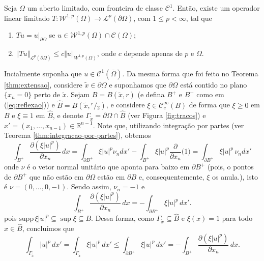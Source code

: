 \documentclass[a4paper, 11pt]{book}
\theoremstyle{definition}
\newcommand{\bR}{\mathbb{R}}
\newcommand{\cC}{\mathcal{C}}
\newcommand{\cL}{\mathcal{L}}
\newcommand{\cW}{\mathcal{W}}
\newcommand{\supp}{\mathrm{supp}\,}
\newcommand{\sfrac}[2]{{}^{#1}\!\!/\!_{#2}}
\begin{document}
\begin{tbox} \label{thm:traco-1}
    Seja $\Omega$ um aberto limitado, com fronteira de classe $\cC^1$. Então, existe um operador linear limitado $T : \cW^{1,p}(\Omega) \to \cL^p(\partial \Omega)$, com $1 \leqslant p < \infty$, tal que
    \begin{enumerate}[leftmargin=*, label=\textbf{(\alph*)}]
        \item $Tu = u \big|_{\partial \Omega}$ se $u \in \cW^{1,p}(\Omega) \cap \cC(\Omega)$;
        \item $\Vert Tu \Vert_{\cL^p(\partial\Omega)} \leqslant c \Vert u \Vert_{W^{1,p}(\Omega)}$, onde $c$ depende apenas de $p$ e $\Omega$.
    \end{enumerate}
\end{tbox} 
\begin{prf}
    Incialmente suponha que $u \in \cC^1(\overline{\Omega})$. Da mesma forma que foi feito no Teorema \ref{thm:extensao}, considere $\tilde x \in \partial\Omega$ e suponhamos que $\partial\Omega$ está contido no plano $\{x_n = 0\}$ perto de $\tilde x$.
    Sejam $B = B(\tilde x, r)$ (e defina $B^+$ e $B^-$ como em (\ref{eq:reflexao})) e $\widehat B = B(\tilde x, \sfrac{r}{2})$,
    e considere $\xi \in \cC^{\infty}_c(B)$ de forma que $\xi \geqslant 0$ em $B$ e $\xi \equiv 1$ em $\widehat B$, e denote $\Gamma_{\tilde x} = \partial \Omega \cap \widehat B$ (ver Figura \ref{fig:tracos}) e $x' = (x_1,\dots,x_{n-1}) \in \bR^{n-1}$.
    Note que, utilizando integração por partes (ver Teorema \ref{thm:integracao-por-partes}), obtemos
    \[
        \int_{B^+} \dfrac{\partial (\xi |u|^p)}{\partial x_n}\,dx = \int_{\partial B^+} \xi |u|^p \nu_n dx' - \int_{B^+} \xi |u|^p \frac{\partial}{\partial x_n} \big( 1 \big) = \int_{\partial B^+} \xi |u|^p \, \nu_n dx'
    \]
    onde $\nu$ é o vetor normal unitário que aponta para baixo em $\partial B^+$ (pois, o pontos de $\partial B^+$ que não estão em $\partial \Omega$ estão em $\partial B$ e, consequentemente, $\xi$ os anula.), isto é $\nu =  (0,\dots,0,-1)$. Sendo assim, $\nu_n = -1$ e 
    \[
        \int_{B^+} \dfrac{\partial (\xi |u|^p)}{\partial x_n} \,dx = -\int_{\partial B^+} \xi |u|^p \,dx'.
    \]
    pois $\supp \xi |u|^p \subseteq \sup \xi \subseteq B$.
    Dessa forma, como $\Gamma_{\tilde x} \subseteq \hat B$ e $\xi(x) = 1$ para todo $x \in \hat B$, concluímos que
    \[
        \int_{\Gamma_{\tilde x}} |u|^p \,dx' = \int_{\Gamma_{\tilde x}} \xi|u|^p \,dx' \leqslant \int_{\partial B^+} \xi|u|^p \,dx' = -\int_{B^+} \dfrac{\partial (\xi |u|^p)}{\partial x_n} \,dx.
    \]

\end{prf}
\end{document}
